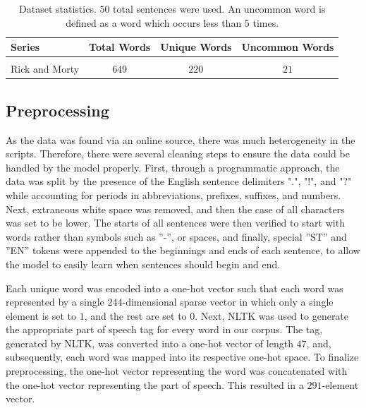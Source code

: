 \documentclass[conference]{IEEEtran}
\begin{document}
\begin{table}[!htbp]
\caption{Dataset statistics. $50$ total sentences were used. An uncommon word is defined as a word which occurs less than $5$ times.}
\label{tab:data}
\begin{center}
\begin{tabular}{lccc}

Series & Total Words & Unique Words & Uncommon Words\\
\hline{}\\
Rick and Morty & $649$ & $220$ & $21$\\

\end{tabular}
\end{center}
\vspace{-1em}
\end{table}

\subsection{Preprocessing}

As the data was found via an online source, there was much heterogeneity in the scripts. Therefore, there were several cleaning steps to ensure the data could be handled by the model properly. First, through a programmatic approach, the data was split by the presence of the English sentence delimiters ".", "!", and "?" while accounting for periods in abbreviations, prefixes, suffixes, and numbers. Next, extraneous white space was removed, and then the case of all characters was set to be lower. The starts of all sentences were then verified to start with words rather than symbols such as ”-”, or spaces, and finally, special ”ST” and ”EN” tokens were appended to the beginnings and ends of each sentence, to allow the model to easily learn when sentences should begin and end. 

Each unique word was encoded into a one-hot vector such that each word was represented by a single $244$-dimensional sparse vector in which only a single element is set to $1$, and the rest are set to $0$. Next, NLTK \cite{bird2004nltk} was used to generate the appropriate part of speech tag for every word in our corpus. The tag, generated by NLTK, was converted into a one-hot vector of length $47$, and, subsequently, each word was mapped into its respective one-hot space.  To finalize preprocessing, the one-hot vector representing the word was concatenated with the one-hot vector representing the part of speech. This resulted in a $291$-element vector.
\end{document}
